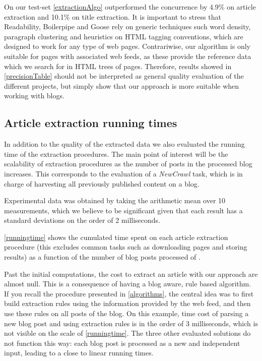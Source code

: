 On our test-set \autoref{extractionAlgo} outperformed the concurrence by 4.9\% on article extraction and 10.1\% on title extraction. It is important to stress that Readability, Boilerpipe and Goose rely on generic techniques such word density, paragraph clustering and heuristics on HTML tagging conventions, which are designed to work for any type of web pages. Contrariwise, our algorithm is only suitable for pages with associated web feeds, as these provide the reference data which we search for in HTML trees of pages. Therefore, results showed in \autoref{precisionTable} should not be interpreted as general quality evaluation of the different projects, but simply show that our approach is more suitable when working with blogs.


\subsection{Article extraction running times}

In addition to the quality of the extracted data we also evaluated the running time of the extraction procedures. The main point of interest will be the scalability of extraction procedures as the number of posts in the processed blog increases. This corresponds to the evaluation of a \emph{NewCrawl} task, which is in charge of harvesting all previously published content on a blog.

Experimental data was obtained by taking the arithmetic mean over 10 measurements, which we believe to be significant given that each result has a standard deviations on the order of 2 milliseconds. 

\autoref{runningtime} shows the cumulated time spent on each article extraction procedure (this excludes common tasks such as downloading pages and storing results) as a function of the number of blog posts processed of .



Past the initial computations, the cost to extract an article with our approach are almost null. This is a consequence of having a blog aware, rule based algorithm. If you recall the procedure presented in \autoref{algorithms}, the central idea was to first build extraction rules using the information provided by the web feed, and then use these rules on all posts of the blog. On this example, time cost of parsing a new blog post and using extraction rules is in the order of 3 milliseconds, which is not visible on the scale of \autoref{runningtime}. The three other evaluated solutions do not function this way: each blog post is processed as a new and independent input, leading to a close to linear running times.

